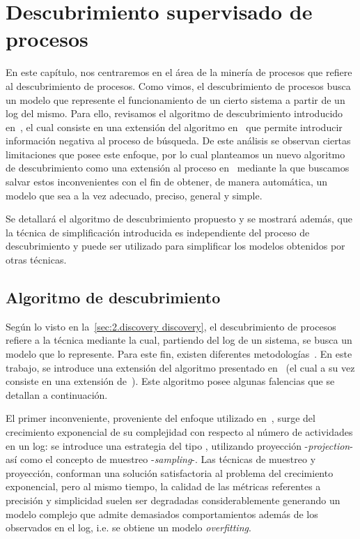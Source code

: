 \chapter{Descubrimiento supervisado de procesos}
\label{chap:3}

En este capítulo, nos centraremos en el área de la minería de procesos que refiere
al descubrimiento de procesos. Como vimos, el descubrimiento de procesos busca un modelo 
que represente el funcionamiento de un cierto sistema a partir de un log del mismo.
Para ello, revisamos el algoritmo de descubrimiento introducido en~\cite{LeonCB15},
el cual consiste en una extensión del algoritmo en~\cite{CarmonaC14} que permite 
introducir información negativa al proceso de búsqueda. De este análisis se observan 
ciertas limitaciones que posee este enfoque, por lo cual planteamos un nuevo 
algoritmo de descubrimiento como una extensión al proceso en~\cite{LeonCB15} mediante 
la que buscamos salvar estos inconvenientes con el fin de obtener, de manera automática, 
un modelo que sea a la vez adecuado, preciso, general y simple.

Se detallará el algoritmo de descubrimiento propuesto y se mostrará además,
que la técnica de simplificación introducida es independiente del proceso de descubrimiento
y puede ser utilizado para simplificar los modelos obtenidos por otras técnicas.

\section{Algoritmo de descubrimiento}
\label{sec:3.algodisco}

Según lo visto en la~\autoref{sec:2.discovery discovery}, el descubrimiento de procesos
refiere a la técnica mediante la cual, partiendo del log de un sistema, se busca
un modelo que lo represente.
Para este fin, existen diferentes metodologías~\cite{CarmonaC14,LeonCB15,MedeirosAW03,AalstWM04}.
En este trabajo, se introduce una extensión del algoritmo presentado en~\cite{LeonCB15} (el cual a
su vez consiste en una extensión de~\cite{CarmonaC14}). Este algoritmo posee algunas falencias
que se detallan a continuación.

El primer inconveniente, proveniente del enfoque utilizado en~\cite{CarmonaC14}, 
surge del crecimiento exponencial de su complejidad con respecto al número de actividades 
en un log: se introduce una estrategia del tipo , 
utilizando proyección -\textit{projection}- así como el concepto de muestreo -\textit{sampling}-.
Las técnicas de muestreo y proyección, conforman una solución satisfactoria al problema del
crecimiento exponencial, pero al mismo tiempo, la calidad de las métricas referentes a 
precisión y simplicidad suelen ser degradadas considerablemente generando un modelo complejo
que admite demasiados comportamientos además de los observados en el log, 
i.e. se obtiene un modelo \textit{overfitting}.

